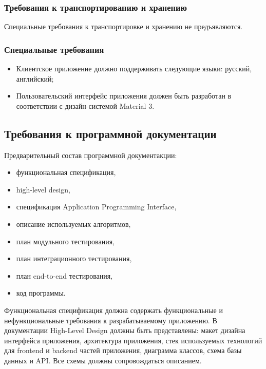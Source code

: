 \documentclass[a4paper, 14pt]{article}
\begin{document}
\subsubsection{Требования к транспортированию и хранению}

Специальные требования к транспортировке и хранению не предъявляются.

\subsubsection{Специальные требования}

\begin{itemize}
    \item Клиентское приложение должно поддерживать следующие языки: русский, английский;
    \item Пользовательский интерфейс приложения должен быть разработан в соответствии с дизайн-системой Material 3.
\end{itemize}

\subsection{Требования к программной документации}

\noindent Предварительный состав программной документакции:
\begin{itemize}
    \item функциональная спецификация,
    \item high-level design,
    \item спецификация Application Programming Interface,
    \item описание используемых алгоритмов,
    \item план модульного тестирования,
    \item план интеграционного тестирования,
    \item план end-to-end тестирования,
    \item код программы.
\end{itemize}

\noindent Функциональная спецификация должна содержать функциональные и нефункциональные требования к разрабатываемому приложению.
В документации High-Level Design должны быть представлены: макет дизайна интерфейса приложения, архитектура приложения,
стек используемых технологий для frontend и backend частей приложения, диаграмма классов, схема базы данных и API. Все
схемы должны сопровождаться описанием.
\end{document}
